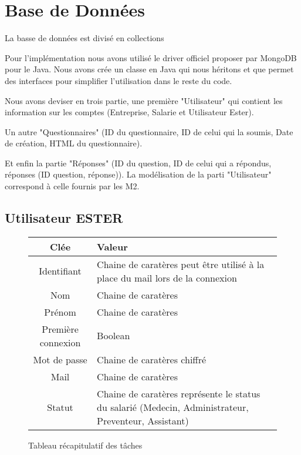 \section{Base de Données}

La basse de données est divisé en collections 

Pour l'implémentation nous avons utilisé le driver officiel proposer par MongoDB pour le Java. Nous avons crée un classe en Java qui nous héritons et que permet des interfaces pour simplifier l'utilisation dans le reste du code.

Nous avons deviser en trois partie, une première "Utilisateur" qui contient les information sur les comptes (Entreprise, Salarie et Utilisateur Ester).

Un autre "Questionnaires" (ID du questionnaire, ID de celui qui la soumis, Date de création, HTML du questionnaire). 

Et enfin la partie "Réponses" (ID du question, ID de celui qui a répondus, réponses (ID question, réponse)). La modélisation de la parti "Utilisateur" correspond à celle fournis par les M2.

\subsection{Utilisateur ESTER}

\begin{figure}[H]
    \begin{center}
        \begin{tabularx}{17cm}{|c|X|}
            \hline
            Clée & Valeur  \tabularnewline 
            \hline
            Identifiant & 
            Chaine de caratères peut être utilisé à la place du mail lors de la connexion \tabularnewline 
            Nom & 
            Chaine de caratères \tabularnewline
            Prénom & 
            Chaine de caratères \tabularnewline
            Première connexion & 
            Boolean \tabularnewline
            Mot de passe & 
            Chaine de caratères chiffré \tabularnewline
            Mail & 
            Chaine de caratères \tabularnewline
            Statut & 
            Chaine de caratères représente le status du salarié (Medecin, Administrateur,
            Preventeur, Assistant) \tabularnewline
            \hline
        \end{tabularx}
    \end{center}
    \caption{Tableau récapitulatif des tâches}
\end{figure}

